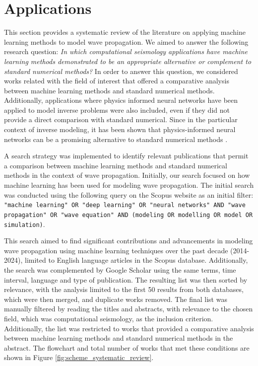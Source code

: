 \documentclass[11pt,twoside]{article}
\begin{document}
\section{Applications}\label{sec:applications}

This section provides a systematic review of the literature on applying machine learning methods to model 
wave propagation. We aimed to answer the following research question: \textit{In which computational 
seismology applications have machine learning methods demonstrated to be an appropriate alternative or
complement to standard numerical methods?} In order to answer this question, we considered works related 
with the field of interest that offered a comparative analysis between machine learning methods and standard
numerical methods. Additionally, applications where physics informed neural networks have been applied to model
inverse problems were also included, even if they did not provide a direct comparison with standard numerical. 
Since in the particular context of inverse modeling, it has been shown that physics-informed neural networks 
can be a promising alternative to standard numerical methods \citep{haghighat_physics-informed_2021,
raissi_hidden_2020}.

A search strategy was implemented to identify relevant publications that permit a comparison between machine 
learning methods and standard numerical methods in the context of wave propagation. Initially, our search focused 
on how machine learning has been used for modeling wave propagation. The initial search was conducted using the 
following query on the Scopus website as an initial filter: \texttt{"machine learning" OR "deep learning" OR 
"neural networks" AND "wave propagation" OR "wave equation" AND (modeling OR modelling OR model OR simulation)}.

This search aimed to find significant contributions and advancements in modeling wave propagation using machine
learning techniques over the past decade (2014-2024), limited to English language articles in the Scopus 
database. Additionally, the search was complemented by Google Scholar using the same terms, time interval, 
language and type of publication. The resulting list was then sorted by relevance, with the analysis limited 
to the first 50 results from both databases, which were then merged, and duplicate works removed. The final 
list was manually filtered by reading the titles and abstracts, with relevance to the chosen field, which was
computational seismology, as the inclusion criterion. Additionally, the list was restricted to works that 
provided a comparative analysis between machine learning methods and standard numerical methods in the 
abstract. The flowchart and total number of works that met these conditions are shown in 
Figure \ref{fig:scheme_systematic_review}.
\end{document}
